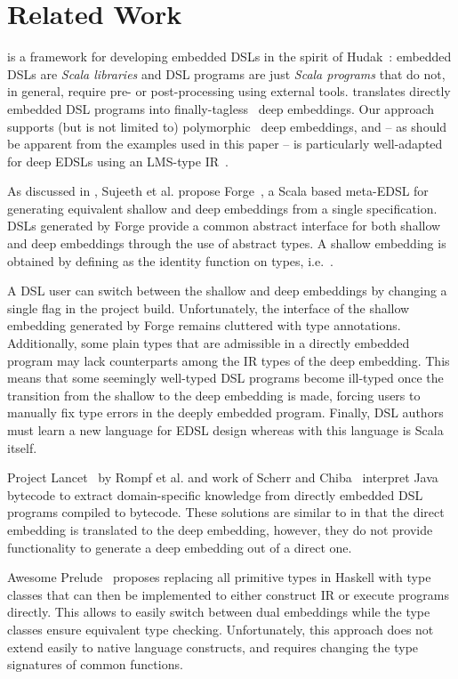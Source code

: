 \section{Related Work}
\label{sec:related-work}

\tool is a framework for developing embedded DSLs in the spirit of
Hudak~\cite{Hudak96csur,Hudak98sr}: embedded DSLs are \emph{Scala
  libraries} and DSL programs are just \emph{Scala programs} that do
not, in general, require pre- or post-processing using external tools.
\tool translates directly embedded DSL programs into
finally-tagless~\cite{carette_finally_2009} deep embeddings.  Our
approach supports (but is not limited to)
polymorphic~\cite{hofer_polymorphic_2008} deep embeddings, and -- as
should be apparent from the examples used in this paper -- is
particularly well-adapted for deep EDSLs using an LMS-type
IR~\cite{rompf_scala-virtualized:_2009,rompf_optimizing_2013}.

As discussed in , Sujeeth et al. propose
Forge~\cite{forge}, a Scala based meta-EDSL for generating equivalent
shallow and deep embeddings from a single specification.  DSLs
generated by Forge provide a common abstract interface for both
shallow and deep embeddings through the use of abstract 
types.  A shallow embedding is obtained by defining  as the
identity function on types, i.e.\ .


A DSL user can switch between the shallow and deep embeddings by
changing a single flag in the project build. Unfortunately, the interface of the shallow
embedding generated by Forge remains cluttered with  type
annotations. Additionally, some plain types that are admissible in a
directly embedded program may lack counterparts among the IR types of
the deep embedding.  This means that some seemingly well-typed DSL
programs become ill-typed once the transition from the shallow to the
deep embedding is made, forcing users to manually fix type errors in
the deeply embedded program. Finally, DSL authors must learn a new
language for EDSL design whereas with \tool this language is Scala
itself.

Project Lancet~\cite{lancet} by Rompf et al. and work of Scherr and
Chiba~\cite{scherr_ecoop_2014} interpret Java bytecode to extract
domain-specific knowledge from directly embedded
DSL programs compiled to bytecode. These solutions are similar to \tool
in that the direct embedding is translated to the deep
embedding, however, they do not provide functionality to
generate a deep embedding out of a direct one.

Awesome Prelude~\cite{awesome} proposes replacing all primitive types
in Haskell with type classes that can then be implemented to either
construct IR or execute programs directly. This allows to easily
switch between dual embeddings while the type classes ensure
equivalent type checking.  Unfortunately, this approach does not
extend easily to native language constructs, and requires changing the
type signatures of common functions.

